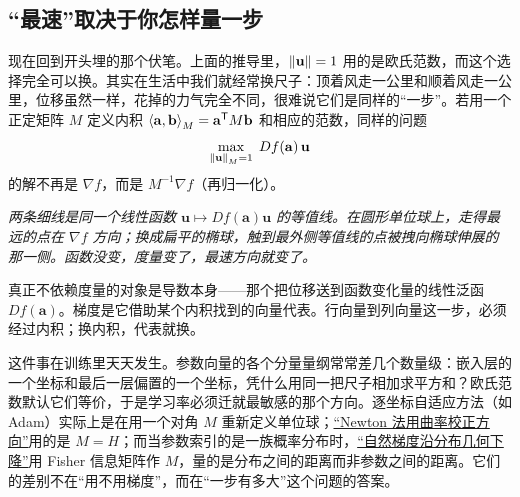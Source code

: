 \subsection{``最速''取决于你怎样量一步}

现在回到开头埋的那个伏笔。上面的推导里，\(\left\lVert\mathbf u\right\rVert=1\) 用的是欧氏范数，而这个选择完全可以换。其实在生活中我们就经常换尺子：顶着风走一公里和顺着风走一公里，位移虽然一样，花掉的力气完全不同，很难说它们是同样的``一步''。若用一个正定矩阵 \(M\) 定义内积 \(\left\langle\mathbf a,\mathbf b\right\rangle_M=\mathbf a^{\mathsf{T}}M\mathbf b\) 和相应的范数，同样的问题
\[
\max_{\left\lVert\mathbf u\right\rVert_M=1}\;Df(\mathbf a)\,\mathbf u
\]
的解不再是 \(\nabla f\)，而是 \(M^{-1}\nabla f\)（再归一化）。

\begin{center}

\emph{两条细线是同一个线性函数 \(\mathbf u\mapsto Df(\mathbf a)\mathbf u\) 的等值线。在圆形单位球上，走得最远的点在 \(\nabla f\) 方向；换成扁平的椭球，触到最外侧等值线的点被拽向椭球伸展的那一侧。函数没变，度量变了，最速方向就变了。}
\end{center}

真正不依赖度量的对象是导数本身——那个把位移送到函数变化量的线性泛函 \(Df(\mathbf a)\)。梯度是它借助某个内积找到的向量代表。行向量到列向量这一步，必须经过内积；换内积，代表就换。

这件事在训练里天天发生。参数向量的各个分量量纲常常差几个数量级：嵌入层的一个坐标和最后一层偏置的一个坐标，凭什么用同一把尺子相加求平方和？欧氏范数默认它们等价，于是学习率必须迁就最敏感的那个方向。逐坐标自适应方法（如 Adam）实际上是在用一个对角 \(M\) 重新定义单位球；\hyperref[sec:09-Convex-Optimization/06-Optimization-Algorithms/02]{``Newton 法用曲率校正方向''}用的是 \(M=H\)；而当参数索引的是一族概率分布时，\hyperref[sec:12-Real-Analysis-Support/09-Information-Geometry/02]{``自然梯度沿分布几何下降''}用 Fisher 信息矩阵作 \(M\)，量的是分布之间的距离而非参数之间的距离。它们的差别不在``用不用梯度''，而在``一步有多大''这个问题的答案。

